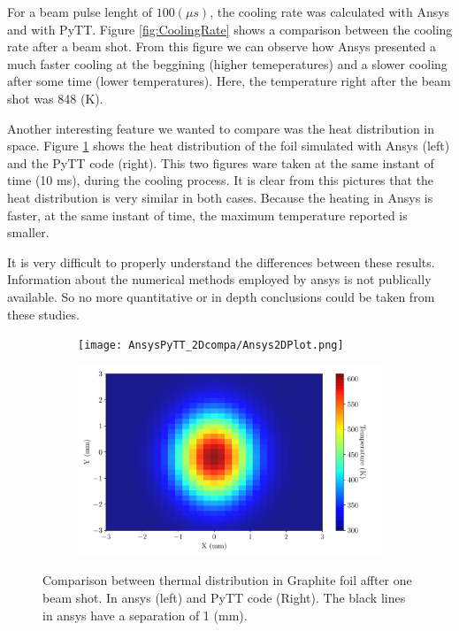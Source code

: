 For a beam pulse lenght of $100 (\mu s)$, the cooling rate was calculated with Ansys and with PyTT. Figure \ref{fig:CoolingRate} shows a comparison between the cooling rate after a beam shot. From this figure we can observe how Ansys presented a much faster cooling at the beggining (higher temeperatures) and a slower cooling after some time (lower temperatures). Here, the temperature right after the beam shot was 848 (K).

Another interesting feature we wanted to compare was the heat distribution in space. Figure \ref{fig:FancyPlotComparison} shows the heat distribution of the foil simulated with Ansys (left) and the PyTT code (right). This two figures ware taken at the same instant of time (10 ms), during the cooling process. It is clear from this pictures that the heat distribution is  very similar in both cases. Because the heating in Ansys is faster, at the same instant of time, the maximum temperature reported is smaller. 

It is very difficult to properly understand the differences between these results. Information about the numerical methods employed by ansys is not publically available. So no more quantitative or in depth conclusions could be taken from these studies. 

\begin{figure}[h]
    \centering
    \begin{subfigure}[b]{0.45\textwidth}
        \centering
        \texttt{[image: AnsysPyTT\_2Dcompa/Ansys2DPlot.png]}
    \end{subfigure}
    \hfill
    \begin{subfigure}[b]{0.5\textwidth}
        \centering
        \includegraphics[width=\textwidth]{AnsysPyTT_2Dcompa/FoilPyTT.pdf}        
    \end{subfigure}

    \caption{Comparison between thermal distribution in Graphite foil affter one beam shot. In ansys (left) and PyTT code (Right). The black lines in ansys have a separation of 1 (mm).}

    \label{fig:FancyPlotComparison} 
\end{figure}



